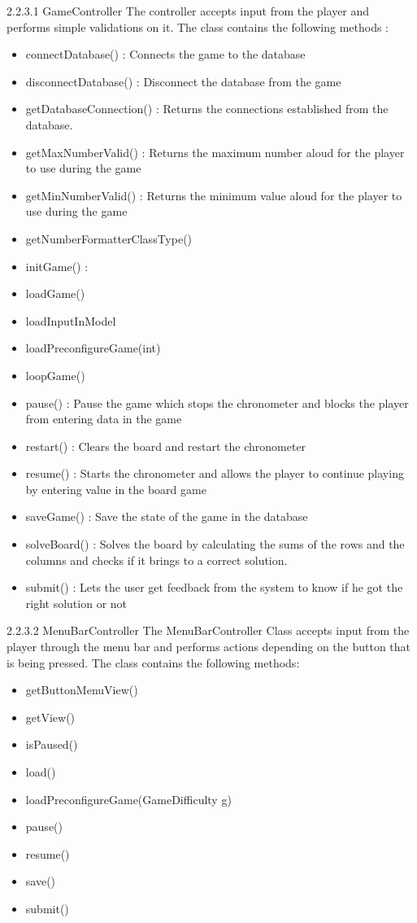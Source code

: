 \documentclass[12pt]{article}
\begin{document}
2.2.3.1 GameController\newline
The controller accepts input from the player and performs simple validations on it. The class contains the following methods : \newline
\begin{itemize}
\item connectDatabase() : Connects the game to the database
\item disconnectDatabase() : Disconnect the database from the game
\item getDatabaseConnection() : Returns the connections established from the database.
\item getMaxNumberValid() : Returns the maximum number aloud for the player to use during the game
\item getMinNumberValid() : Returns the minimum value aloud for the player to use during the game
\item getNumberFormatterClassType()
\item initGame() : 
\item loadGame()
\item loadInputInModel
\item loadPreconfigureGame(int)
\item loopGame()
\item pause() : Pause the game which stops the chronometer and blocks the player from entering data in the game
\item restart() : Clears the board and restart the chronometer
\item resume() : Starts the chronometer and allows the player to continue playing by entering value in the board game
\item saveGame() : Save the state of the game in the database
\item solveBoard() : Solves the board by calculating the sums of the rows and the columns and checks if it brings to a correct solution. 
\item submit() : Lets the user get feedback from the system to know if he got the right solution or not \newline
\end{itemize}


2.2.3.2 MenuBarController\newline
The MenuBarController Class accepts input from the player through the menu bar and performs actions depending on the button that is being pressed. The class contains the following methods:\newline
\begin{itemize}
\item getButtonMenuView()
\item getView()
\item isPaused()
\item load()
\item loadPreconfigureGame(GameDifficulty g)
\item pause()
\item resume()
\item save()
\item submit()\newline
\end{itemize}
\end{document}

